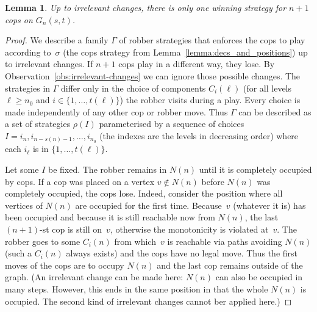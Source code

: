 \documentclass[authoryear]{article}
\newtheorem{lemma}[theorem]{Lemma}
\theoremstyle{definition}
\newcommand{\0}{\emptyset}
\begin{document}
\begin{lemma}\label{lemma:unique-sigma}
Up to irrelevant changes, there is only one winning strategy for $n+1$
cops on $G_n(s,t)$.
\end{lemma}
\begin{proof}
  We describe a family $\Gamma$ of robber strategies that enforces the
  cops to play according to~$\sigma$ (the cops strategy from
  Lemma~\ref{lemma:decs_and_positions}) up to irrelevant changes. If
  $n+1$ cops play in a different way, they lose. By
  Observation~\ref{obs:irrelevant-changes} we can ignore those
  possible changes. The strategies in $\Gamma$ differ only in the
  choice of components $C_i(\ell)$ (for all levels $\ell\ge n_0$ and
  $i\in\{1,\ldots,t(\ell)\}$) the robber visits during a play. Every
  choice is made independently of any other cop or robber move. Thus
  $\Gamma$ can be described as a set of strategies $\rho(I)$
  parameterised by a sequence of choices
  $I = i_n,i_{n-s(n)-1},\ldots,i_{n_0}$ (the indexes are the levels in
  decreasing order) where each $i_{\ell}$ is in
  $\{1,\ldots,t(\ell)\}$.

  Let some $I$ be fixed.  The robber remains in $N(n)$ until it is completely
  occupied by cops. If a cop was placed on a vertex $v\notin N(n)$ before $N(n)$
  was completely occupied, the cops lose. Indeed, consider the position where
  all vertices of $N(n)$ are occupied for the first time. Because~$v$ (whatever
  it is) has been occupied and because it is still reachable now from $N(n)$,
  the last $(n+1)$-st cop is still on~$v$, otherwise the monotonicity is
  violated at~$v$. The robber goes to some $C_i(n)$ from which~$v$ is reachable
  via paths avoiding $N(n)$ (such a $C_i(n)$ always exists) and the cops have no
  legal move. Thus the first moves of the cops are to occupy $N(n)$ and the last
  cop remains outside of the graph. (An irrelevant change can be made here:
  $N(n)$ can also be occupied in many steps. However, this ends in the same
  position in that the whole $N(n)$ is occupied. The second kind of irrelevant
  changes cannot ber applied here.)


\end{proof}
\end{document}
